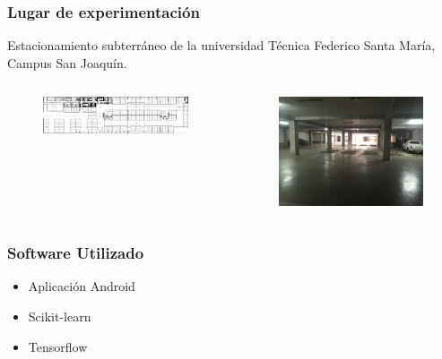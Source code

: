 \documentclass[handout]{beamer}
\begin{document}
\begin{frame}
\frametitle{Lugar de experimentación}

Estacionamiento subterráneo de la universidad Técnica Federico Santa María, Campus San Joaquín.

\begin{columns}[t] %

\begin{figure}
\includegraphics[width=\textwidth]{../figures/estSubterraneo.png}
\end{figure}

\begin{figure}
\includegraphics[width=\textwidth]{../figures/estReal.jpg}
\end{figure}

\end{columns}

\end{frame}


\begin{frame}
\frametitle{Software Utilizado}

\begin{itemize}
\item Aplicación Android
	
\pause

\item Scikit-learn

\pause

\item Tensorflow

\end{itemize}

\end{frame}
\end{document}
